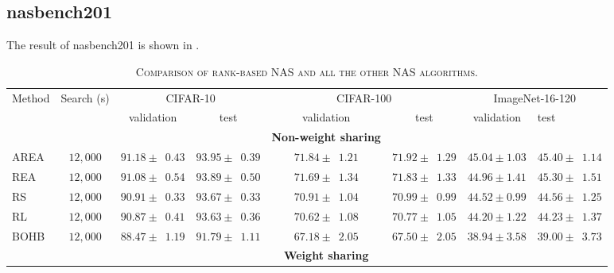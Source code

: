 \documentclass[sigconf]{acmart}
\begin{document}
    \subsection*{nasbench201}
    The result of nasbench201 is shown in .
    \begin{table*}[htb]
        \newcommand{\z}{\phantom{0}}
        \caption{\textsc{Comparison of rank-based NAS and all the other NAS algorithms.}}
          \vspace{-\baselineskip}
        \begin{tabular}{@{}lccccccl@{}}\toprule
        Method & Search (s) & \multicolumn{2}{c}{CIFAR-10} & \multicolumn{2}{c}{CIFAR-100} & \multicolumn{2}{c}{ImageNet-16-120} \\ \cmidrule(lr){3-4}\cmidrule(lr){5-6}\cmidrule(lr){7-8}
        & & validation & test & validation & test & validation & test \\ \midrule
        &&&&\textbf{Non-weight sharing}&&&\\
        AREA      & $12,000$ & $91.18 \pm \z{0.43}$                & $93.95 \pm \z{0.39}$               & $71.84 \pm \z{1.21}$                 & $71.92 \pm \z{1.29}$                & $45.04 \pm 1.03$                 & $45.40 \pm \z{1.14}$                \\
        REA       & $12,000$ & $91.08 \pm \z{0.54}$                & $93.89 \pm \z{0.50}$               & $71.69 \pm \z{1.34}$                 & $71.83 \pm \z{1.33}$                & $44.96 \pm 1.41$                 & $45.30 \pm \z{1.51}$                \\
        RS        & $12,000$ & $90.91 \pm \z{0.33}$                & $93.67 \pm \z{0.33}$               & $70.91 \pm \z{1.04}$                 & $70.99 \pm \z{0.99}$                & $44.52 \pm 0.99$                 & $44.56 \pm \z{1.25}$                \\
        RL        & $12,000$ & $90.87 \pm \z{0.41}$                & $93.63 \pm \z{0.36}$               & $70.62 \pm \z{1.08}$                 & $70.77 \pm \z{1.05}$                & $44.20 \pm 1.22$                 & $44.23 \pm \z{1.37}$                \\
        BOHB      & $12,000$ & $88.47 \pm \z{1.19}$                & $91.79 \pm \z{1.11}$               & $67.18 \pm \z{2.05}$                 & $67.50 \pm \z{2.05}$                & $38.94 \pm 3.58$                 & $39.00 \pm \z{3.73}$                \\ \midrule
        &&&&\textbf{Weight sharing}&&&\\

\end{tabular}
\end{table*}
\end{document}
